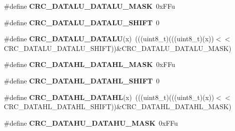\begin{DoxyCompactItemize}
\item 
\#define {\bfseries C\+R\+C\+\_\+\+D\+A\+T\+A\+L\+U\+\_\+\+D\+A\+T\+A\+L\+U\+\_\+\+M\+A\+SK}~0x\+F\+Fu\hypertarget{group__CRC__Register__Masks_gacf86687293ecef8f5067951339146b2e}{}\label{group__CRC__Register__Masks_gacf86687293ecef8f5067951339146b2e}

\item 
\#define {\bfseries C\+R\+C\+\_\+\+D\+A\+T\+A\+L\+U\+\_\+\+D\+A\+T\+A\+L\+U\+\_\+\+S\+H\+I\+FT}~0\hypertarget{group__CRC__Register__Masks_gadb699078287075d9c73c0ececa7c11c4}{}\label{group__CRC__Register__Masks_gadb699078287075d9c73c0ececa7c11c4}

\item 
\#define {\bfseries C\+R\+C\+\_\+\+D\+A\+T\+A\+L\+U\+\_\+\+D\+A\+T\+A\+LU}(x)~(((uint8\+\_\+t)(((uint8\+\_\+t)(x))$<$$<$C\+R\+C\+\_\+\+D\+A\+T\+A\+L\+U\+\_\+\+D\+A\+T\+A\+L\+U\+\_\+\+S\+H\+I\+FT))\&C\+R\+C\+\_\+\+D\+A\+T\+A\+L\+U\+\_\+\+D\+A\+T\+A\+L\+U\+\_\+\+M\+A\+SK)\hypertarget{group__CRC__Register__Masks_ga262be66a69987ce042fd0519e27dd682}{}\label{group__CRC__Register__Masks_ga262be66a69987ce042fd0519e27dd682}

\item 
\#define {\bfseries C\+R\+C\+\_\+\+D\+A\+T\+A\+H\+L\+\_\+\+D\+A\+T\+A\+H\+L\+\_\+\+M\+A\+SK}~0x\+F\+Fu\hypertarget{group__CRC__Register__Masks_ga7774128f4d39b06d75e221d7c058f60e}{}\label{group__CRC__Register__Masks_ga7774128f4d39b06d75e221d7c058f60e}

\item 
\#define {\bfseries C\+R\+C\+\_\+\+D\+A\+T\+A\+H\+L\+\_\+\+D\+A\+T\+A\+H\+L\+\_\+\+S\+H\+I\+FT}~0\hypertarget{group__CRC__Register__Masks_ga76f45a4ca9734a414f5e73deb79ead0e}{}\label{group__CRC__Register__Masks_ga76f45a4ca9734a414f5e73deb79ead0e}

\item 
\#define {\bfseries C\+R\+C\+\_\+\+D\+A\+T\+A\+H\+L\+\_\+\+D\+A\+T\+A\+HL}(x)~(((uint8\+\_\+t)(((uint8\+\_\+t)(x))$<$$<$C\+R\+C\+\_\+\+D\+A\+T\+A\+H\+L\+\_\+\+D\+A\+T\+A\+H\+L\+\_\+\+S\+H\+I\+FT))\&C\+R\+C\+\_\+\+D\+A\+T\+A\+H\+L\+\_\+\+D\+A\+T\+A\+H\+L\+\_\+\+M\+A\+SK)\hypertarget{group__CRC__Register__Masks_ga55870105cff064737819f25ba302f07e}{}\label{group__CRC__Register__Masks_ga55870105cff064737819f25ba302f07e}

\item 
\#define {\bfseries C\+R\+C\+\_\+\+D\+A\+T\+A\+H\+U\+\_\+\+D\+A\+T\+A\+H\+U\+\_\+\+M\+A\+SK}~0x\+F\+Fu\hypertarget{group__CRC__Register__Masks_ga1dadbb252b94eae6d58efd4955a57eb2}{}\label{group__CRC__Register__Masks_ga1dadbb252b94eae6d58efd4955a57eb2}


\end{DoxyCompactItemize}
